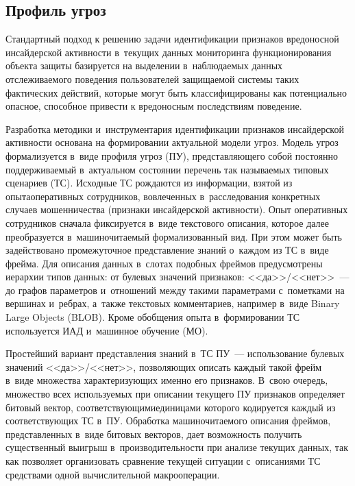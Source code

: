 \begin{multicols}{2}
  \section{Профиль угроз}
  
  Стандартный подход к решению задачи идентификации признаков 
вредоносной инсайдерской активности в~текущих данных мониторинга 
функционирования объекта защиты базируется на выделении в~наблюдаемых 
данных отслеживаемого поведения пользователей защищаемой системы таких 
фактических действий, которые могут быть классифицированы как 
потенциально опасное, способное привести к вредоносным последствиям 
поведение. 
  
  Разработка методики и~инструментария идентификации признаков 
инсайдерской активности основана на формировании актуальной модели угроз. 
Модель угроз формализуется в~виде профиля угроз (ПУ), представляющего 
собой постоянно поддерживаемый в~актуальном состоянии перечень так 
называемых типовых сценариев (ТС). Исходные ТС рождаются из информации, 
взятой из опыта\linebreak оперативных сотрудников, вовлеченных в~расследования 
конкретных случаев мошенничества (признаки инсайдерской активности). 
Опыт оперативных сотрудников сначала фиксируется \mbox{в~виде} текстового 
описания, которое далее преобразуется в~машиночитаемый формализованный 
вид. При этом может быть задействовано промежуточное представление знаний 
о~каждом из ТС в~виде фрейма. Для описания данных в~слотах подобных 
фреймов предусмотрены иерархии типов данных: от булевых значений 
признаков:  <<да>>/<<нет>>~--- до графов параметров и~отношений между 
такими параметрами с~пометками на вершинах и~ребрах, а~также текстовых 
комментариев, например в~виде Binary Large Objects (BLOB). Кроме 
обобщения опыта в~формировании ТС используется ИАД и~машинное обучение (МО).
  
  Простейший вариант представления знаний в~ТС ПУ~--- использование 
булевых значений <<да>>/<<нет>>, позволяющих описать каждый такой фрейм 
в~виде множества характеризующих именно его признаков. В~свою очередь, 
множество всех используемых при описании текущего ПУ признаков 
определяет битовый вектор, соответствующими\linebreak единицами которого 
кодируется каждый из соответствующих ТС в~ПУ. Обработка ма\-ши\-но\-чи\-та\-емо\-го 
описания фреймов, представленных в~виде битовых векторов, дает 
возможность получить существенный выигрыш в~производительности при 
анализе текущих данных, так как позволяет организовать сравнение текущей 
ситуации с~описаниями ТС средствами одной вычислительной макрооперации.
  

\end{multicols}
